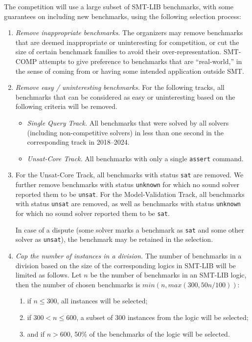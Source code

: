 \documentclass[12pt]{article}
\newcommand{\maintrack}{Single Query Track\xspace}
\newcommand{\ucoretrack}{Unsat-Core Track\xspace}
\newcommand{\mvaltrack}{Model-Validation Track\xspace}
\begin{document}
 \label{benchmark-selection}
The competition will use a large subset of SMT-LIB benchmarks, with some
guarantees on including new benchmarks, using the following selection process:
\begin{enumerate}
\item \emph{Remove inappropriate benchmarks.} The
  organizers may remove benchmarks that are deemed inappropriate or
  uninteresting for competition, or cut the size of certain benchmark
  families to avoid their over-representation.  SMT-COMP attempts to
  give preference to benchmarks that are ``real-world,'' in the sense
  of coming from or having some intended application outside SMT.
\item \emph{Remove easy / uninteresting benchmarks.}
  For the following tracks, all benchmarks that can be
  considered as easy or uninteresting based on the following criteria
  will be removed.
  \begin{itemize}
    \item \emph{\maintrack.} All benchmarks that were solved by all
      solvers (including non-competitive solvers) in less than one second in
          the corresponding track in 2018--2024.
    \item \emph{\ucoretrack.} All benchmarks with only a single \texttt{assert} command.
  \end{itemize}

\item
  For the \ucoretrack, all benchmarks with status
  \texttt{sat} are removed.  We further remove benchmarks with status
  \texttt{unknown} for which no sound solver reported them to be
  \texttt{unsat}.
  For the \mvaltrack,  all benchmarks with status \texttt{unsat} are removed,
  as well as benchmarks with status
  \texttt{unknown} for which no sound solver reported them to be
  \texttt{sat}.

  In case of a dispute (some solver marks a benchmark as \texttt{sat}
  and some other solver as \texttt{unsat}), the benchmark may be retained in
  the selection.

\item \emph{Cap the number of instances in a division.}
  The number of benchmarks in a division based on the size of the
  corresponding logics in SMT-LIB will be limited as follows.
  Let $n$ be the number of benchmarks in an SMT-LIB logic, then
  the number of chosen benchmarks is $min(n, max(300, 50n/100))$:
  \begin{enumerate}
  \vspace{-1ex}
    \item \label{bench-sel-300} if $n \le 300$, all instances will be selected;
  \item \label{bench-sel-600} if $300 < n \leq 600$, a subset of 300 instances
    from the logic will be selected;
  \item \label{bench-sel-more} and if $n > 600$,
      50\% of the benchmarks of the logic will be selected.
    \end{enumerate}
\end{enumerate}
\end{document}
